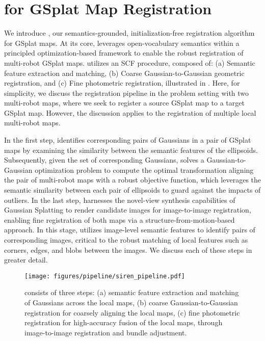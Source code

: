 \section{\algname for GSplat Map Registration}
\label{sec:method}
We introduce \algname, our semantics-grounded, initialization-free registration algorithm for GSplat maps. At its core, \algname leverages open-vocabulary semantics within a principled optimization-based framework to enable the robust registration of multi-robot GSplat maps. \algname utilizes an SCF procedure, composed of: (a) Semantic feature extraction and matching, (b) Coarse Gaussian-to-Gaussian geometric registration, and (c) Fine photometric registration, illustrated in 
.
Here, for simplicity, we discuss the registration pipeline in the problem setting with two multi-robot maps, where we seek to register a source GSplat map to a target GSplat map. However, the discussion applies to the registration of multiple local multi-robot maps.


In the first step, \algname identifies corresponding pairs of Gaussians in a pair of GSplat maps by examining the similarity between the semantic features of the ellipsoids. Subsequently, given the set of corresponding Gaussians, \algname solves a Gaussian-to-Gaussian optimization problem to compute the optimal transformation aligning the pair of multi-robot maps with a robust objective function, which leverages the semantic similarity between each pair of ellipsoids to guard against the impacts of outliers. In the last step, \algname harnesses the novel-view synthesis capabilities of Gaussian Splatting to render candidate images for image-to-image registration, enabling fine registration of both maps via a structure-from-motion-based approach. In this stage, \algname utilizes image-level semantic features to identify pairs of corresponding images, critical to the robust matching of local features such as corners, edges, and blobs between the images. We discuss each of these steps in greater detail.


\begin{figure*}[th]
    \centering
    \texttt{[image: figures/pipeline/siren\_pipeline.pdf]}
    \caption{\algname consists of three steps: (a) semantic feature extraction and matching of Gaussians across the local maps, (b) coarse Gaussian-to-Gaussian registration for coarsely aligning the local maps, (c) fine photometric registration for high-accuracy fusion of the local maps, through image-to-image registration and bundle adjustment.}
    \label{fig:siren_pipeline}
\end{figure*}

